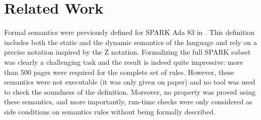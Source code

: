 \section{Related Work}
\label{sec:related-work}
Formal semantics were previously defined for SPARK Ada 83 in \cite{Marsh:Book94,Neil:Book94}. 
This definition includes both the static and the dynamic semantics of 
the language and rely on a precise notation inspired by the Z notation. 
Formalizing the full SPARK subset was clearly a challenging task and 
the result is indeed quite impressive: more than 500 pages were 
required for the complete set of rules. However, these semantics 
were not executable (it was only given on paper) and no tool was used 
to check the soundness of the definition. Moreover, no property was 
proved using these semantics, and more importantly, run-time checks 
were only considered as side conditions on semantics rules without 
being formally described.


